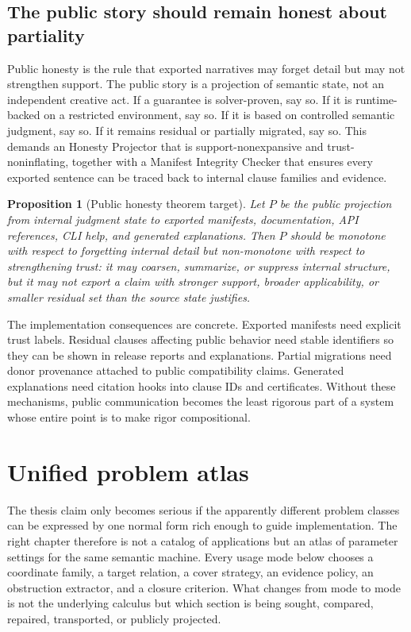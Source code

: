 \documentclass[11pt]{report}
\newtheorem{proposition}[definition]{Proposition}
\begin{document}
\section{The public story should remain honest about partiality}
Public honesty is the rule that exported narratives may forget detail but may not strengthen support. The public story is a projection of semantic state, not an independent creative act. If a guarantee is solver-proven, say so. If it is runtime-backed on a restricted environment, say so. If it is based on controlled semantic judgment, say so. If it remains residual or partially migrated, say so. This demands an Honesty Projector that is support-nonexpansive and trust-noninflating, together with a Manifest Integrity Checker that ensures every exported sentence can be traced back to internal clause families and evidence.

\begin{proposition}[Public honesty theorem target]
Let $P$ be the public projection from internal judgment state to exported manifests, documentation, API references, CLI help, and generated explanations. Then $P$ should be monotone with respect to forgetting internal detail but non-monotone with respect to strengthening trust: it may coarsen, summarize, or suppress internal structure, but it may not export a claim with stronger support, broader applicability, or smaller residual set than the source state justifies.
\end{proposition}

The implementation consequences are concrete. Exported manifests need explicit trust labels. Residual clauses affecting public behavior need stable identifiers so they can be shown in release reports and explanations. Partial migrations need donor provenance attached to public compatibility claims. Generated explanations need citation hooks into clause IDs and certificates. Without these mechanisms, public communication becomes the least rigorous part of a system whose entire point is to make rigor compositional.
\chapter{Unified problem atlas}
The thesis claim only becomes serious if the apparently different problem classes can be expressed by one normal form rich enough to guide implementation. The right chapter therefore is not a catalog of applications but an atlas of parameter settings for the same semantic machine. Every usage mode below chooses a coordinate family, a target relation, a cover strategy, an evidence policy, an obstruction extractor, and a closure criterion. What changes from mode to mode is not the underlying calculus but which section is being sought, compared, repaired, transported, or publicly projected.
\end{document}
